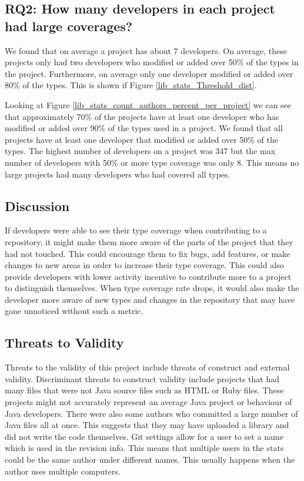 \documentclass{sig-alternate-05-2015}
\begin{document}
\subsection{RQ2: How many developers in each project had large coverages?}
We found that on average a project has about 7 developers. On average, these projects only had two developers who modified or added over 50\% of the types in the project. Furthermore, on average only one developer modified or added over 80\% of the types. This is shown if Figure \ref{lib_stats_Threshold_dist}.

Looking at Figure \ref{lib_stats_count_authors_percent_per_project} we can see that approximately 70\% of the projects have at least one developer who has modified or added over 90\% of the types used in a project. We found that all projects have at least one developer that modified or added over 50\% of the types. The highest number of developers on a project was 347 but the max number of developers with 50\% or more type coverage was only 8. This means no large projects had many developers who had covered all types.

\subsection{Discussion}
If developers were able to see their type coverage when contributing to a repository, it might make them more aware of the parts of the project that they had not touched. This could encourage them to fix bugs, add features, or make changes to new areas in order to increase their type coverage. This could also provide developers with lower activity incentive to contribute more to a project to distinguish themselves. When type coverage rate drops, it would also make the developer more aware of new types and changes in the repository that may have gone unnoticed without such a metric.

\subsection{Threats to Validity}
Threats to the validity of this project include threats of construct and external validity. Discriminant threats to construct validity include projects that had many files that were not Java source files such as HTML or Ruby files. These projects might not accurately represent an average Java project or behaviour of Java developers. There were also some authors who committed a large number of Java files all at once. This suggests that they may have uploaded a library and did not write the code themselves. Git settings allow for a user to set a name which is used in the revision info. This means that multiple users in the stats could be the same author under different names. This usually happens when the author uses multiple computers.
\end{document}
